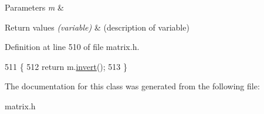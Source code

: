 \begin{DoxyParams}{Parameters}
{\em m} & \\
\hline
\end{DoxyParams}

\begin{DoxyRetVals}{Return values}
{\em (variable)} & (description of variable) \\
\hline
\end{DoxyRetVals}


Definition at line 510 of file matrix.\+h.


\begin{DoxyCode}
511         \{
512             \textcolor{keywordflow}{return} m.\hyperlink{classMatrix_acaac7c3eb8f32224c07dcd620ca44e26}{invert}();
513         \}
\end{DoxyCode}


The documentation for this class was generated from the following file\+:\begin{DoxyCompactItemize}
\item 
matrix.\+h\end{DoxyCompactItemize}
